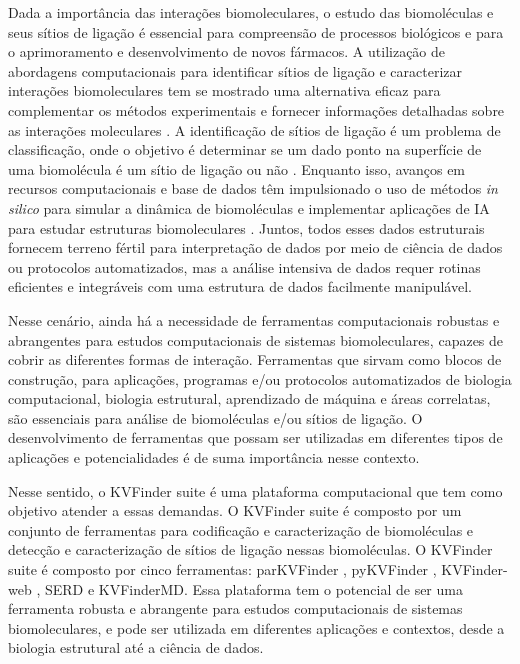 \documentclass[Portugues]{phdquali}
\begin{document}
Dada a importância das interações biomoleculares, o estudo das biomoléculas e seus sítios de ligação é essencial para compreensão de processos biológicos e para o aprimoramento e desenvolvimento de novos fármacos. A utilização de abordagens computacionais para identificar sítios de ligação e caracterizar interações biomoleculares tem se mostrado uma alternativa eficaz para complementar os métodos experimentais e fornecer informações detalhadas sobre as interações moleculares \cite{simoes2017}. A identificação de sítios de ligação é um problema de classificação, onde o objetivo é determinar se um dado ponto na superfície de uma biomolécula é um sítio de ligação ou não \cite{sotriffer2002,henrich2010,simoes2017}. Enquanto isso, avanços em recursos computacionais e base de dados têm impulsionado o uso de métodos \textit{in silico} para simular a dinâmica de biomoléculas e implementar aplicações de IA para estudar estruturas biomoleculares \cite{tunyasuvunakool2021}. Juntos, todos esses dados estruturais fornecem terreno fértil para interpretação de dados por meio de ciência de dados ou protocolos automatizados, mas a análise intensiva de dados requer rotinas eficientes e integráveis com uma estrutura de dados facilmente manipulável.

Nesse cenário, ainda há a necessidade de ferramentas computacionais robustas e abrangentes para estudos computacionais de sistemas biomoleculares, capazes de cobrir as diferentes formas de interação. Ferramentas que sirvam como blocos de construção, para aplicações, programas e/ou protocolos automatizados de biologia computacional, biologia estrutural, aprendizado de máquina e áreas correlatas, são essenciais para análise de biomoléculas e/ou sítios de ligação. O desenvolvimento de ferramentas que possam ser utilizadas em diferentes tipos de aplicações e potencialidades é de suma importância nesse contexto.

Nesse sentido, o KVFinder suite é uma plataforma computacional que tem como objetivo atender a essas demandas. O KVFinder suite é composto por um conjunto de ferramentas para codificação e caracterização de biomoléculas e detecção e caracterização de sítios de ligação nessas biomoléculas. O KVFinder suite é composto por cinco ferramentas: parKVFinder \cite{guerra2020}, pyKVFinder \cite{guerra2021}, KVFinder-web \cite{guerra2023A}, SERD e KVFinderMD. Essa plataforma tem o potencial de ser uma ferramenta robusta e abrangente para estudos computacionais de sistemas biomoleculares, e pode ser utilizada em diferentes aplicações e contextos, desde a biologia estrutural até a ciência de dados.
\end{document}
